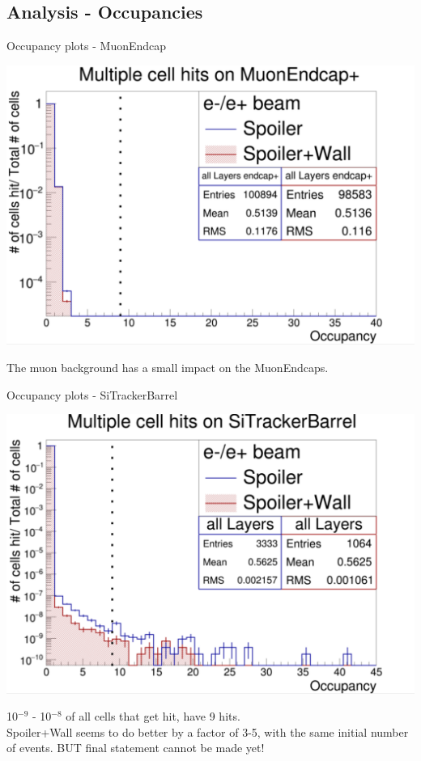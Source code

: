 \documentclass[xcolor={dvipsnames}]{beamer}
\begin{document}
\subsection{Analysis - Occupancies}
\begin{frame}{Occupancy plots - MuonEndcap}
 \begin{center}
\includegraphics[height=0.7\textheight]{Occupancy_MuonEndcap.pdf}
\end{center}
The muon background has a small impact on the MuonEndcaps.
\end{frame}
\begin{frame}{Occupancy plots - SiTrackerBarrel}
 \begin{center}
\includegraphics[height=0.68\textheight]{Occupancy_SiTrackerBarrel.pdf}
\end{center}
\footnotesize 10$^{-9}$ - 10$^{-8}$ of all cells that get hit, have 9 hits.\\
\small Spoiler+Wall seems to do better by a factor of 3-5, with the same initial number of events. BUT final statement cannot be made yet!
\end{frame}
\end{document}
